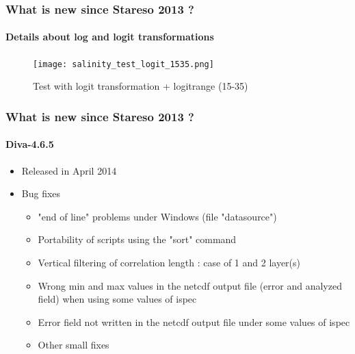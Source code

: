 \begin{frame}
 \frametitle{What is new since Stareso 2013 ?}
 \framesubtitle{Details about log and logit transformations}
   \vspace{-3mm}
 \begin{figure}
 \centering
  \caption{Test with logit transformation + logitrange (15-35)}
   \vspace{-3mm}
 \texttt{[image: salinity\_test\_logit\_1535.png]}
 \end{figure}
\end{frame}
\begin{frame}
 \frametitle{What is new since Stareso 2013 ?}
 \framesubtitle{Diva-4.6.5}
 \begin{itemize}
  \item Released in April 2014
  \item Bug fixes
  \begin{itemize}
  \item "end of line" problems under Windows (file "datasource")
  \item Portability of scripts using the "sort" command
  \item Vertical filtering of correlation length : case of 1 and 2 layer(s) 
  \item Wrong min and max values in the netcdf output file (error and analyzed field) when using some values of ispec
  \item Error field not written in the netcdf output file under some values of ispec  
  \item Other small fixes   
  \end{itemize}
  \end{itemize}
\end{frame}
